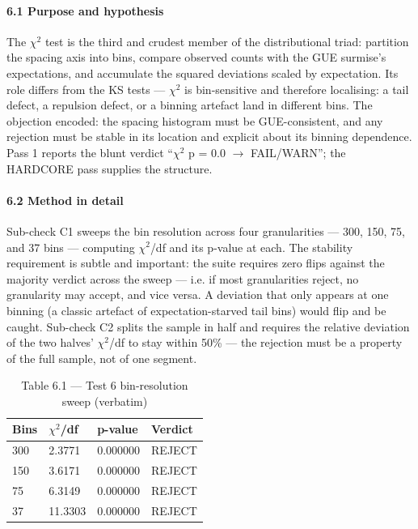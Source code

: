 \documentclass[10pt]{article}
\begin{document}
\paragraph{6.1 Purpose and hypothesis}

The $\chi$$^2$ test is the third and crudest member of the distributional triad: partition the spacing axis into bins, compare observed counts with the GUE surmise's expectations, and accumulate the squared deviations scaled by expectation. Its role differs from the KS tests --- $\chi$$^2$ is bin-sensitive and therefore localising: a tail defect, a repulsion defect, or a binning artefact land in different bins. The objection encoded: the spacing histogram must be GUE-consistent, and any rejection must be stable in its location and explicit about its binning dependence. Pass 1 reports the blunt verdict ``$\chi$$^2$ p = 0.0 $\rightarrow$ FAIL/WARN''; the HARDCORE pass supplies the structure.

\paragraph{6.2 Method in detail}

Sub-check C1 sweeps the bin resolution across four granularities --- 300, 150, 75, and 37 bins --- computing $\chi$$^2$/df and its p-value at each. The stability requirement is subtle and important: the suite requires zero flips against the majority verdict across the sweep --- i.e. if most granularities reject, no granularity may accept, and vice versa. A deviation that only appears at one binning (a classic artefact of expectation-starved tail bins) would flip and be caught. Sub-check C2 splits the sample in half and requires the relative deviation of the two halves' $\chi$$^2$/df to stay within 50\% --- the rejection must be a property of the full sample, not of one segment.

\begin{table}[htbp]
\centering
\small
\caption{Table 6.1 --- Test 6 bin-resolution sweep (verbatim)}
\begin{tabular}{llll}
\toprule
\textbf{Bins} & \textbf{$\chi$$^2$/df} & \textbf{p-value} & \textbf{Verdict} \\
\midrule
300 & 2.3771 & 0.000000 & REJECT \\
150 & 3.6171 & 0.000000 & REJECT \\
75 & 6.3149 & 0.000000 & REJECT \\
37 & 11.3303 & 0.000000 & REJECT \\
\bottomrule
\end{tabular}
\end{table}
\end{document}
